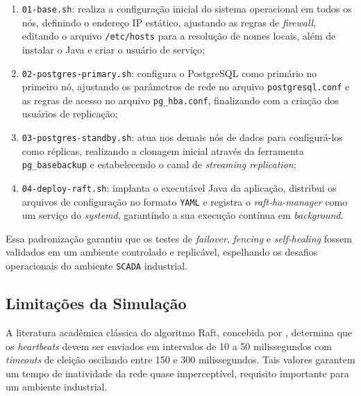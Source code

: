         \begin{enumerate}
            \item \verb|01-base.sh|: realiza a configuração inicial do sistema operacional em todos os nós, definindo o endereço IP estático, ajustando as regras de \textit{firewall}, editando o arquivo \verb|/etc/hosts| para a resolução de nomes locais, além de instalar o Java e criar o usuário de serviço;
            
            \item \verb|02-postgres-primary.sh|: configura o PostgreSQL como primário no primeiro nó, ajustando os parâmetros de rede no arquivo \verb|postgresql.conf| e as regras de acesso no arquivo \verb|pg_hba.conf|, finalizando com a criação dos usuários de replicação;
            
            \item \verb|03-postgres-standby.sh|: atua nos demais nós de dados para configurá-los como réplicas, realizando a clonagem inicial através da ferramenta \verb|pg_basebackup| e estabelecendo o canal de \textit{streaming replication};
            
            \item \verb|04-deploy-raft.sh|: implanta o executável Java da aplicação, distribui os arquivos de configuração no formato \verb|YAML| e registra o \textit{raft-ha-manager} como um serviço do \textit{systemd}, garantindo a sua execução contínua em \textit{background}.
        \end{enumerate}
        
        Essa padronização garantiu que os testes de \textit{failover}, \textit{fencing} e \textit{self-healing} fossem validados em um ambiente controlado e replicável, espelhando os desafios operacionais do ambiente \verb|SCADA| industrial.

        \subsection{Limitações da Simulação}

        A literatura acadêmica clássica do algoritmo Raft, concebida por , determina que os \textit{heartbeats} devem ser enviados em intervalos de 10 a 50 milissegundos com \textit{timeouts} de eleição oscilando entre 150 e 300 milissegundos. Tais valores garantem um tempo de inatividade da rede quase imperceptível, requisito importante para um ambiente industrial.

